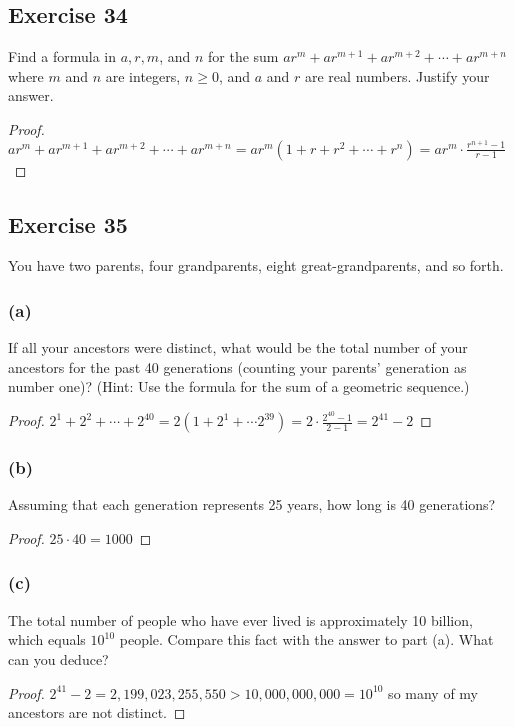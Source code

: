 \documentclass[14pt]{extarticle}
\newcommand{\dps}{\displaystyle}
\begin{document}
\subsection{Exercise 34}
Find a formula in $a, r, m$, and $n$ for the sum $ar^m + ar^{m+1} + ar^{m+2} + \cdots + ar^{m+n}$ where $m$ and $n$ are integers, $n \geq 0$, and $a$ and $r$ are real numbers. Justify your answer.

\begin{proof}
    $\dps ar^m + ar^{m+1} + ar^{m+2} + \cdots + ar^{m + n} = ar^m(1 + r + r^2 + \cdots + r^n) = ar^m \cdot \frac{r^{n + 1} - 1}{r - 1}$
\end{proof}

\subsection{Exercise 35}
You have two parents, four grandparents, eight great-grandparents, and so forth.

\subsubsection{(a)}
If all your ancestors were distinct, what would be the total number of your ancestors for the past 40 generations (counting your parents’ generation as number one)? (Hint: Use the formula for the sum of a geometric sequence.)

\begin{proof}
    $\dps 2^1 + 2^2 + \cdots + 2^{40} = 2(1 + 2^1 + \cdots 2^{39}) = 2 \cdot \frac{2^{40} - 1}{2 - 1} = 2^{41} - 2$
\end{proof}

\subsubsection{(b)}
Assuming that each generation represents 25 years, how long is 40 generations?

\begin{proof}
    $25 \cdot 40 = 1000$
\end{proof}

\subsubsection{(c)}
The total number of people who have ever lived is approximately 10 billion, which equals $10^{10}$ people. Compare this fact with the answer to part (a). What can you deduce?

\begin{proof}
    $2^{41} - 2 = 2,199,023,255,550 > 10,000,000,000 = 10^{10}$ so many of my ancestors are not distinct.
\end{proof}
\end{document}
